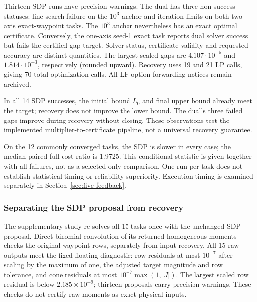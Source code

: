\documentclass[pdflatex,sn-mathphys-num]{sn-jnl}
\theoremstyle{thmstyleone}
\theoremstyle{thmstyletwo}\newtheorem{remark}[theorem]{Remark}
\begin{document}
Thirteen SDP runs have precision warnings. The dual has three non-success
statuses: line-search failure on the $10^3$ anchor and iteration limits on
both two-axis exact-waypoint tasks. The $10^3$ anchor nevertheless has an exact
optimal certificate. Conversely, the one-axis seed-1 exact task reports
dual solver success but fails the certified gap target. Solver status,
certificate validity and requested accuracy are distinct quantities.
The largest scaled gaps are $4.107\cdot10^{-5}$ and $1.814\cdot10^{-3}$,
respectively (rounded upward). Recovery uses 19 and 21 LP calls, giving 70
total optimization calls. All LP option-forwarding notices remain archived.

In all 14 SDP successes, the initial bound $L_0$ and final upper bound already
meet the target; recovery does not improve the lower bound. The dual's three
failed gaps improve during recovery without closing. These observations test
the implemented multiplier-to-certificate pipeline, not a universal recovery
guarantee.

On the 12 commonly converged tasks, the SDP is slower in every case; the
median paired full-cost ratio is 1.9725. This conditional statistic is given
together with all failures, not as a selected-only comparison. One run per
task does not establish statistical timing or reliability superiority.
Execution timing is examined separately in Section~\ref{sec:five-feedback}.

\subsubsection{Separating the SDP proposal from recovery}\label{sec:five-attribution}
The supplementary study re-solves all 15 tasks once with the unchanged SDP
proposal. Direct binomial convolution of its returned homogeneous moments
checks the original waypoint rows, separately from input recovery. All 15
raw outputs meet the fixed floating diagnostic: row residuals at most
$10^{-7}$ after scaling by the maximum of one, the adjusted target magnitude
and row tolerance, and cone residuals at most $10^{-7}\max(1,|J|)$.
The largest scaled row residual is below $2.185\times10^{-9}$; thirteen
proposals carry precision warnings. These checks do not certify raw moments
as exact physical inputs.
\end{document}
